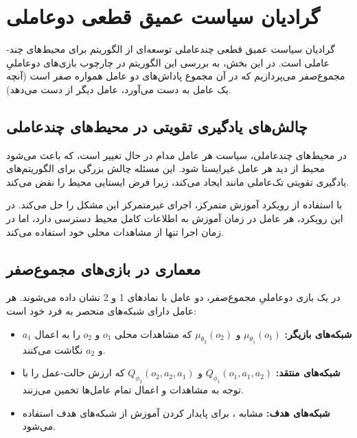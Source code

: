 \section{ گرادیان سیاست عمیق قطعی 
دو­عاملی
}\label{sec:marl_maddpg}

گرادیان سیاست عمیق قطعی چند­عاملی
توسعه‌ای از الگوریتم  برای محیط‌های چند­عاملی است. در این بخش، به بررسی این الگوریتم در چارچوب بازی‌های دو­عاملیِ مجموع­‌صفر می‌پردازیم که در آن مجموع پاداش‌های دو عامل همواره صفر است (آنچه یک عامل به دست می‌آورد، عامل دیگر از دست می‌دهد).

\subsection{چالش‌های یادگیری تقویتی در محیط‌های چند­عاملی}

در محیط‌های چند­عاملی، سیاست هر عامل مدام در حال تغییر است، که باعث می‌شود محیط از دید هر عامل غیرایستا شود. این مسئله چالش بزرگی برای الگوریتم‌های یادگیری تقویتی تک‌عاملی مانند  ایجاد می‌کند، زیرا فرض ایستایی محیط را نقض می‌کند.

 با استفاده از رویکرد آموزش متمرکز، اجرای غیرمتمرکز این مشکل را حل می‌کند. در این رویکرد، هر عامل در زمان آموزش به اطلاعات کامل محیط دسترسی دارد، اما در زمان اجرا تنها از مشاهدات محلی خود استفاده می‌کند.

\subsection{معماری  در بازی‌های مجموع­‌صفر}

در یک بازی دو­عاملیِ مجموع­‌صفر، دو عامل با نمادهای 1 و 2 نشان داده می‌شوند. هر عامل دارای شبکه‌های منحصر به فرد خود است:

\begin{itemize}
    \item \textbf{شبکه‌های بازیگر:} $\mu_{\theta_1}(o_1)$ و $\mu_{\theta_2}(o_2)$ که مشاهدات محلی $o_1$ و $o_2$ را به اعمال $a_1$ و $a_2$ نگاشت می‌کنند.
    \item \textbf{شبکه‌های منتقد:} $Q_{\phi_1}(o_1, a_1, a_2)$ و $Q_{\phi_2}(o_2, a_2, a_1)$ که ارزش حالت-عمل را با توجه به مشاهدات و اعمال تمام عامل‌ها تخمین می‌زنند.
    \item \textbf{شبکه‌های هدف:} مشابه ، برای پایدار کردن آموزش از شبکه‌های هدف استفاده می‌شود.
\end{itemize}

